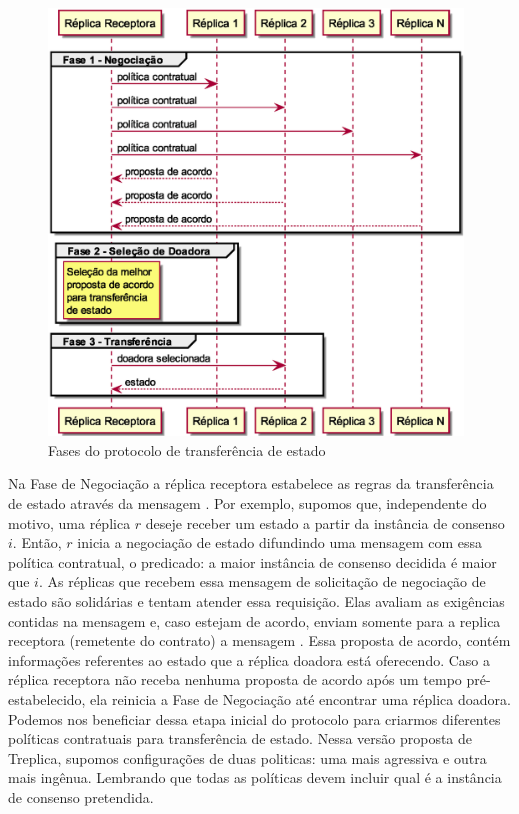 \begin{figure}[ht]
  \centering
  \includegraphics[width=11cm]{conteudo/capitulos/figuras/fases_protocolo_transferencia.eps}
  \caption{Fases do protocolo de transferência de estado}
  \label{fig:fases_protocolo}
\end{figure}

Na Fase de Negociação a réplica receptora estabelece as regras da transferência de estado
através da mensagem . Por exemplo, supomos que, independente do
motivo, uma réplica $r$ deseje receber um estado a partir da instância de consenso $i$.
Então, $r$ inicia a negociação de estado difundindo uma mensagem com essa política
contratual, o predicado: a maior instância de consenso decidida é maior que $i$. As
réplicas que recebem essa mensagem de solicitação de negociação de estado são solidárias e
tentam atender essa requisição. Elas avaliam as exigências contidas na mensagem e, caso
estejam de acordo, enviam somente para a replica receptora (remetente do contrato) a
mensagem . Essa proposta de acordo, contém informações referentes
ao estado que a réplica doadora está oferecendo. Caso a réplica receptora não receba
nenhuma proposta de acordo após um tempo pré-estabelecido, ela reinicia a Fase de
Negociação até encontrar uma réplica doadora. Podemos nos beneficiar dessa etapa inicial
do protocolo para criarmos diferentes políticas contratuais para transferência de estado.
Nessa versão proposta de Treplica, supomos configurações de duas politicas: uma mais
agressiva e outra mais ingênua. Lembrando que todas as políticas devem incluir qual é a
instância de consenso pretendida.

